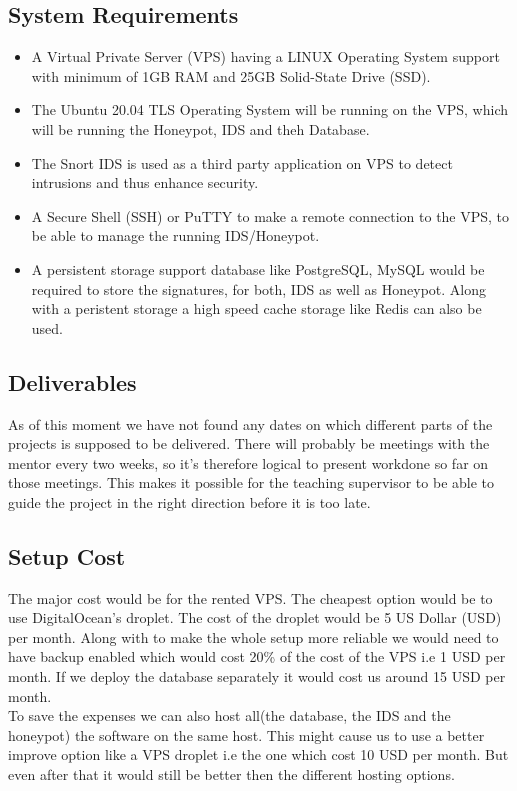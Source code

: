 \documentclass[conference]{IEEEtran}
\begin{document}
\subsection{System Requirements}
\begin{itemize}
    
\item A Virtual Private Server (VPS) having a LINUX Operating System support with minimum of 1GB RAM and 25GB Solid-State Drive (SSD).
\item The Ubuntu 20.04 TLS Operating System will be running on the VPS, which will be running the Honeypot, IDS and theh Database.
\item The Snort IDS is used as a third party application on VPS to detect intrusions and thus enhance security.
\item A Secure Shell (SSH) or PuTTY to make a remote connection to the VPS, to be able to manage the running IDS/Honeypot.
\item A persistent storage support database like PostgreSQL, MySQL would be required to store the signatures, for both, IDS as well as Honeypot. Along with a peristent storage a high speed cache storage like Redis can also be used.
\end{itemize}

\subsection{Deliverables}
As of this moment we have not found any dates on which different parts of the projects is supposed to be delivered. There will probably be meetings with the mentor every two weeks, so it’s therefore logical to present workdone so far on those meetings. This makes it possible for the teaching supervisor to be able to guide the project in the right direction before it is too late.

\subsection{Setup Cost}
The major cost would be for the rented VPS. The cheapest option would be to use DigitalOcean's droplet. The cost of the droplet would be 5 US Dollar (USD) per month. Along with to make the whole setup more reliable we would need to have backup enabled which would cost 20\% of the cost of the VPS i.e 1 USD per month. If we deploy the database separately it would cost us around 15 USD per month.\\
To save the expenses we can also host all(the database, the IDS and the honeypot) the software on the same host. This might cause us to use a better improve option like a VPS droplet i.e the one which cost 10 USD per month. But even after that it would still be better then the different hosting options. 
\end{document}
